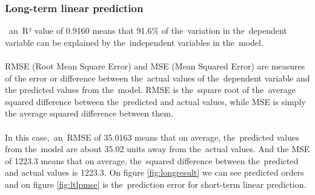     \subsubsection{Long-term linear prediction} \label{subsec:res_ltlp}
    ~an~R² value of 0.9160 means that 91.6\% of the~variation in the~dependent
    variable can be explained by the~independent variables in the~model.\\
    \\
    RMSE (Root Mean Square Error) and MSE (Mean Squared Error) are measures of the
    error or difference between the~actual values of the~dependent variable and the
    predicted values from the~model. RMSE is the~square root of the~average squared
    difference between the~predicted and actual values, while MSE is simply the
    average squared difference between them.\\
    \\
    In this case,~an~RMSE of 35.0163 means that on average, the~predicted values from
     the~model are about 35.02 units away from the~actual values. And the
    MSE of 1223.3 means that on average, the~squared difference between the~predicted
    and actual values is 1223.3. On figure \ref{fig:longresult} we can see predicted
    orders and on figure \ref{fig:ltlpmse} is the~prediction error for short-term
    linear prediction.
